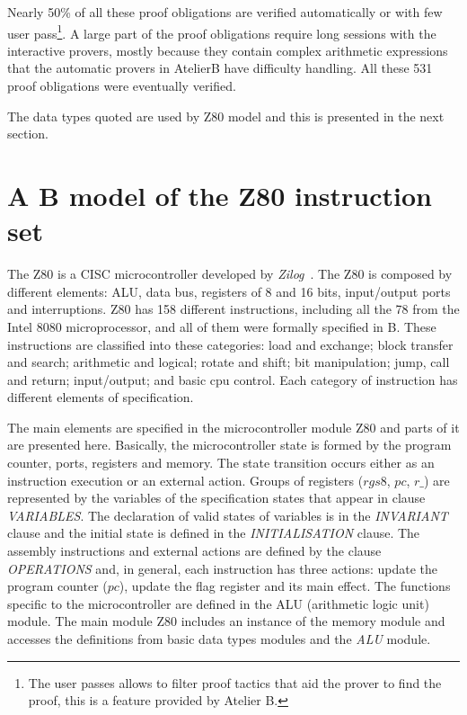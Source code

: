 \documentclass[a4paper]{llncs}
\begin{document}
Nearly 50\% of all these proof obligations are verified automatically or with few user pass\footnote{The user passes allows to filter proof tactics that aid the prover to find the proof, this is a feature provided by Atelier B.}. A large part of the proof obligations require long sessions with the interactive provers, mostly because they contain complex arithmetic expressions that the automatic provers in AtelierB have difficulty handling. 
All these 531 proof obligations were eventually verified. 

 The data types quoted are used by Z80 model and this is presented in the next section.


\section{A B model of the Z80 instruction set}
\label{sec:z80}

The Z80 is a CISC microcontroller developed by \textit{Zilog}~\cite{Z80_manual}. 
The Z80 is composed by different elements: ALU, data bus, registers of 8 and 16
bits, input/output ports and interruptions. Z80 has 158 different instructions, 
including all the 78 from the Intel 8080 microprocessor, and all of them were
formally specified in B. These instructions are classified into these categories: load and
exchange; block transfer and search; arithmetic and logical; rotate
and shift; bit manipulation; jump, call and return; input/output; and
basic cpu control. Each category of instruction has different elements
of specification.

The main elements are specified in the microcontroller module Z80 and parts of it are presented here.  Basically, the
microcontroller state is formed by the program counter, ports,
registers and memory. The state transition occurs either as an instruction
execution or an external action. Groups of registers ($rgs8$, $pc$, $r\_$) are represented
by the variables of the specification states that appear in clause
\textit{VARIABLES}. The declaration of valid states of variables is in
the \textit{INVARIANT} clause and the initial state is defined in the
\textit{INITIALISATION} clause. The assembly instructions and external actions are defined
by the clause \textit{OPERATIONS} and, in general, each instruction
has three actions: update the program counter ($pc$), update the flag
register and its main effect.
The functions specific to the microcontroller are defined in the ALU
(arithmetic logic unit) module. The main module Z80 includes an instance of
the memory module and accesses the definitions from basic data types
modules and the \textit{ALU} module.
\end{document}
